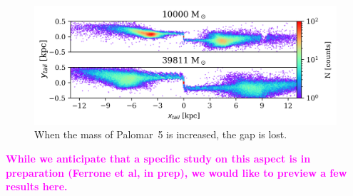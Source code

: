 \documentclass{aa}
\newcommand{\paola}[1]{\textcolor{magenta}{{#1}}}
\begin{document}
\begin{appendix}
\begin{figure}
    \centering
    \includegraphics[width=1\linewidth]{gap_no_more.png}
    \caption{When the mass of Palomar~5 is increased, the gap is lost.}
    \label{fig:gap_no_more.png}
\end{figure}

\textbf{\paola{While we anticipate that a specific study on this aspect is in preparation (Ferrone et al, in prep), we would like to preview a few results here.
}}
\end{appendix}
\end{document}
